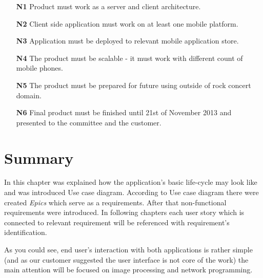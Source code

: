 \begin{enumerate}
\item[\textbf{N1}] \label{req_N1} Product must work as a server and client architecture.
\item[\textbf{N2}] \label{req_N2} Client side application must work on at least one mobile platform.
\item[\textbf{N3}] \label{req_N3} Application must be deployed to relevant mobile application store.
\item[\textbf{N4}] \label{req_N4} The product must be scalable - it must work with different count of mobile phones.
\item[\textbf{N5}] \label{req_N5} The product must be prepared for future using outside of rock concert domain.
\item[\textbf{N6}] \label{req_N6} Final product must be finished until 21st of November 2013 and presented to the committee and the customer.
\end{enumerate}

\section{Summary}
In this chapter was explained how the application's basic life-cycle may look like and was introduced Use case diagram.
According to Use case diagram there were created \emph{Epics} which serve as a requirements. 
After that non-functional requirements were introduced.
In following chapters each user story which is connected to relevant requirement will be referenced with requirement's identification.

As you could see, end user's interaction with both applications is rather simple (and as our customer suggested the user interface is not core of the work) the main attention will be focused on image processing and network programming.